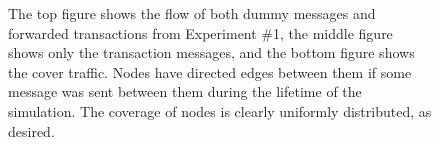 \begin{figure}[ht!]
\begin{center}
\caption{The top figure shows the flow of both dummy messages and forwarded transactions from Experiment \#1, the middle figure shows only the transaction messages, and the bottom figure shows the cover traffic. Nodes have directed edges between them if some message was sent between them during the lifetime of the simulation. The coverage of nodes is clearly uniformly distributed, as desired.}
\label{fig:flow}
\end{center}
\end{figure}



